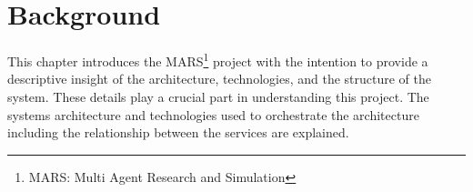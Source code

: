 \newpage
\chapter{Background}
	
This chapter introduces the MARS\footnote{MARS: Multi Agent Research and Simulation} project with the intention to provide a descriptive insight
of the architecture, technologies, and the structure of the system. These details play a crucial part in understanding this project. 
The systems architecture and technologies used to orchestrate the architecture including the 
relationship between the services are explained.

	
	
	
	